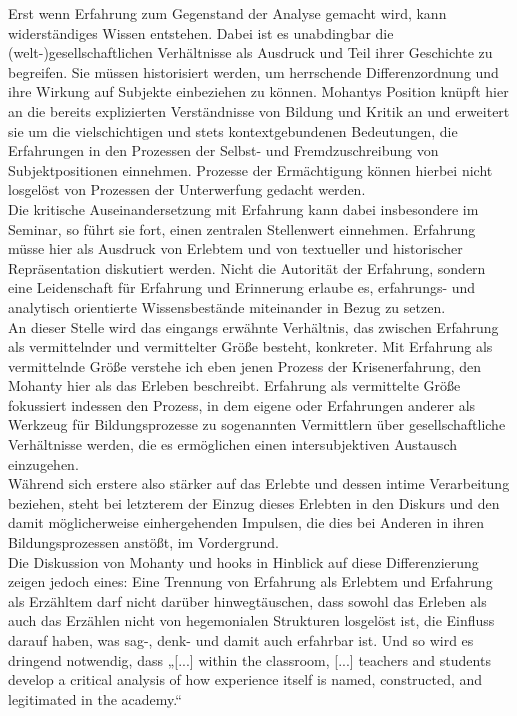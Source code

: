 \noindent Erst wenn Erfahrung zum Gegenstand der Analyse gemacht wird, kann
widerständiges Wissen entstehen. Dabei ist es unabdingbar die
(welt-)gesellschaftlichen Verhältnisse als Ausdruck und Teil ihrer Geschichte
zu begreifen. Sie müssen historisiert werden, um herrschende Differenzordnung
und ihre Wirkung auf Subjekte einbeziehen zu können. Mohantys Position knüpft
hier an die bereits explizierten Verständnisse von Bildung und Kritik an und
erweitert sie um die vielschichtigen und stets kontextgebundenen Bedeutungen,
die Erfahrungen in den Prozessen der Selbst- und Fremdzuschreibung von
Subjektpositionen einnehmen. Prozesse der Ermächtigung können hierbei nicht
losgelöst von Prozessen der Unterwerfung gedacht werden.\\
Die kritische Auseinandersetzung mit Erfahrung kann dabei insbesondere im
Seminar, so führt sie fort, einen zentralen Stellenwert einnehmen. Erfahrung
müsse hier als Ausdruck von Erlebtem und von textueller und historischer
Repräsentation diskutiert werden. Nicht die Autorität der Erfahrung, sondern
eine Leidenschaft für Erfahrung und Erinnerung erlaube es, erfahrungs- und
analytisch orientierte Wissensbestände miteinander in Bezug zu
setzen.\footnotemark{}\\

\noindent An dieser Stelle wird das eingangs erwähnte Verhältnis, das zwischen Erfahrung
als vermittelnder und vermittelter Größe besteht, konkreter. Mit Erfahrung als
vermittelnde Größe verstehe ich eben jenen Prozess der Krisenerfahrung, den
Mohanty hier als das Erleben beschreibt. Erfahrung als vermittelte Größe
fokussiert indessen den Prozess, in dem eigene oder Erfahrungen anderer als
Werkzeug für Bildungsprozesse zu sogenannten Vermittlern über gesellschaftliche
Verhältnisse werden, die es ermöglichen einen intersubjektiven Austausch
einzugehen.\\
Während sich erstere also stärker auf das Erlebte und dessen intime
Verarbeitung beziehen, steht bei letzterem der Einzug dieses Erlebten in den
Diskurs und den damit möglicherweise einhergehenden Impulsen, die dies bei
Anderen in ihren Bildungsprozessen anstößt, im Vordergrund.\\

\noindent Die Diskussion von Mohanty und hooks in Hinblick auf diese Differenzierung
zeigen jedoch eines: Eine Trennung von Erfahrung als Erlebtem und Erfahrung als
Erzähltem darf nicht darüber hinwegtäuschen, dass sowohl das Erleben als auch
das Erzählen nicht von hegemonialen Strukturen losgelöst ist, die Einfluss
darauf haben, was sag-,  denk- und damit auch erfahrbar ist. Und so wird es
dringend notwendig, dass „[...] within the classroom, [...] teachers and
students develop a critical analysis of how experience itself is named,
constructed, and legitimated in the academy.“\footnotemark{}\\

